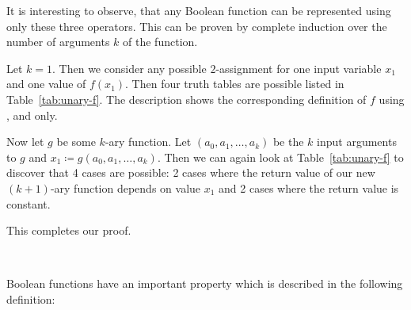 It is interesting to observe, that any Boolean function can be represented
using only these three operators. This can be proven by complete induction
over the number of arguments $k$ of the function.

Let $k = 1$. Then we consider any possible $2$-assignment for one input
variable $x_1$ and one value of $f(x_1)$. Then four truth tables are possible
listed in Table~\ref{tab:unary-f}. The description shows the corresponding
definition of $f$ using ,  and  only.

Now let $g$ be some $k$-ary function. Let $(a_0, a_1, \ldots, a_k)$ be the
$k$ input arguments to $g$ and $x_1 \coloneqq g(a_0, a_1, \ldots, a_k)$.
Then we can again look at Table~\ref{tab:unary-f} to discover that 4 cases
are possible: 2 cases where the return value of our new $(k+1)$-ary function
depends on value $x_1$ and 2 cases where the return value is constant.

This completes our proof.

\begin{table}[ht]
  \centering
  ~
  ~
  ~
  \caption{Unary $f$ and its four possible cases}
  \label{tab:unary-f}
\end{table}

Boolean functions have an important property which is described
in the following definition:

